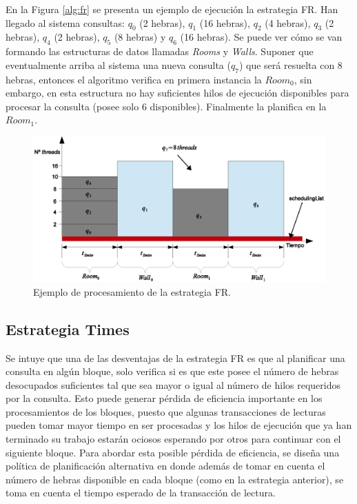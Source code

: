 En la Figura \ref{alg:fr} se presenta un ejemplo de ejecución la estrategia FR. Han llegado al sistema consultas: $q_{0}$ (2 hebras), $q_1$ (16 hebras), $q_2$ (4 hebras), $q_3$ (2 hebras), $q_4$ (2 hebras), $q_5$ (8 hebras) y $q_6$ (16 hebras). Se puede ver cómo se van formando las estructuras de datos llamadas \textit{Rooms} y \textit{Walls}. Suponer que eventualmente arriba al sistema una nueva consulta ($q_7$) que será resuelta con 8 hebras, entonces el algoritmo verifica en primera instancia la $Room_0$, sin embargo, en esta estructura no hay suficientes hilos de ejecución disponibles para procesar la consulta (posee solo 6 disponibles). Finalmente la planifica en la $Room_1$.

\begin{figure}[!th]
\centering
\includegraphics[scale=.75]{images/proceso_FR.eps}
\caption{Ejemplo de procesamiento de la estrategia FR.}
\label{fig:proceso_FR}
\end{figure} 

\subsection{Estrategia Times}
\label{scheduling:times}
Se intuye que una de las desventajas de la estrategia FR es que al planificar una consulta en algún bloque, solo verifica si es que este posee el número de hebras desocupados suficientes tal que sea mayor o igual al número de hilos requeridos por la consulta. Esto puede generar pérdida de eficiencia importante en los procesamientos de los bloques, puesto que algunas transacciones de lecturas pueden tomar mayor tiempo en ser procesadas y los hilos de ejecución que ya han terminado su trabajo estarán ociosos esperando por otros para continuar con el siguiente bloque. Para abordar esta posible pérdida de eficiencia, se diseña una política de planificación alternativa en donde además de tomar en cuenta el número de hebras disponible en cada bloque (como en la estrategia anterior), se toma en cuenta el tiempo esperado de la transacción de lectura.

